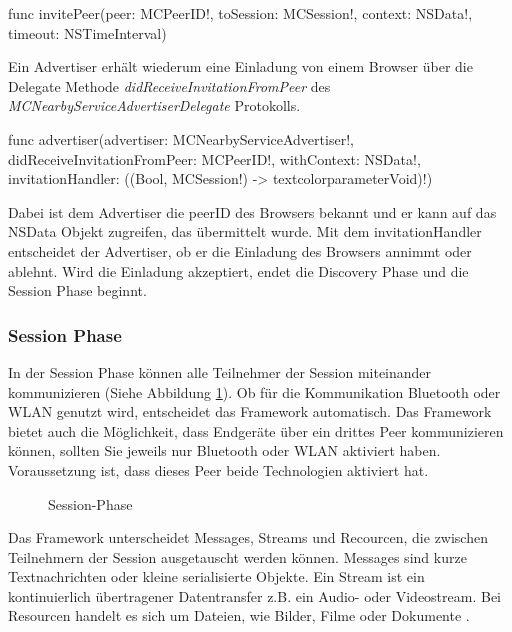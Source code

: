 \begin{description}  
  \item \textcolor{type}{func} invitePeer(peer: \textcolor{parameter}{MCPeerID!}, toSession: \textcolor{parameter}{ MCSession!}, context: \textcolor{parameter}{NSData!}, timeout: \textcolor{parameter}{NSTimeInterval})
\end{description}

Ein Advertiser erhält wiederum eine Einladung von einem Browser über die Delegate Methode \textit{didReceiveInvitationFromPeer} des \textit{MCNearbyServiceAdvertiserDelegate} Protokolls.

\begin{description}  
  \item \textcolor{type}{func} advertiser(advertiser: \textcolor{parameter}{MCNearbyServiceAdvertiser!}, didReceiveInvitationFromPeer: \textcolor{parameter}{ MCPeerID!}, withContext: \textcolor{parameter}{NSData!}, invitationHandler: ((\textcolor{parameter}{Bool}, \textcolor{parameter}{MCSession!}) -> textcolor{parameter}{Void})!)
\end{description}

Dabei ist dem Advertiser die peerID des Browsers bekannt und er kann auf das NSData Objekt zugreifen, das übermittelt wurde. Mit dem invitationHandler entscheidet der Advertiser, ob er die Einladung des Browsers annimmt oder ablehnt. Wird die Einladung akzeptiert, endet die Discovery Phase und die Session Phase beginnt.

\subsubsection{Session Phase}
In der Session Phase können alle Teilnehmer der Session miteinander kommunizieren (Siehe Abbildung \ref{fig:session}). Ob für die Kommunikation Bluetooth oder \ac{WLAN} genutzt wird, entscheidet das Framework automatisch. Das Framework bietet auch die Möglichkeit, dass Endgeräte über ein drittes Peer kommunizieren können, sollten Sie jeweils nur Bluetooth oder \ac{WLAN} aktiviert haben. Voraussetzung ist, dass dieses Peer beide Technologien aktiviert hat.

\begin{figure}[H] 
\centering 
\resizebox{230pt}{!}{}
\caption{Session-Phase} 
\label{fig:session}
\end{figure}

Das Framework unterscheidet Messages, Streams und Recourcen, die zwischen Teilnehmern der Session ausgetauscht werden können. Messages sind kurze Textnachrichten oder kleine serialisierte Objekte. Ein Stream ist ein kontinuierlich übertragener Datentransfer z.B. ein Audio- oder Videostream. Bei Resourcen handelt es sich um Dateien, wie Bilder, Filme oder Dokumente \cite{AppleMultipeer:Online}.

